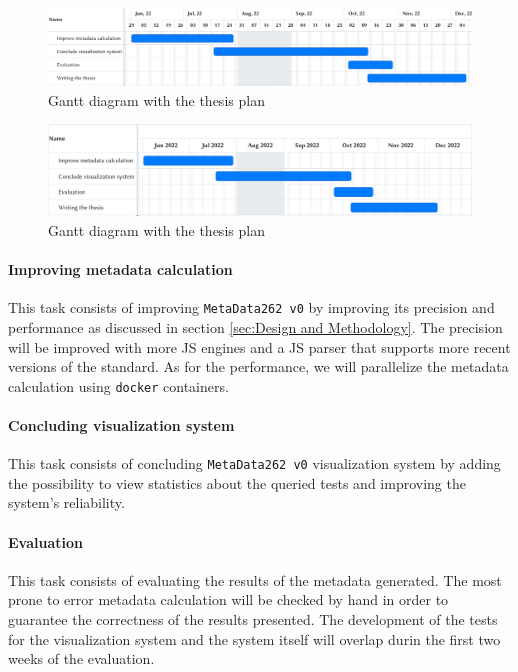 \documentclass[runningheads]{llncs}
\begin{document}
\begin{figure}[ht]
    \centering
    \includegraphics[width=1\textwidth]{images/gantt_thesis.png}
    \caption{Gantt diagram with the thesis plan}
    \label{fig:gantt}
\end{figure}

\begin{figure}[ht]
    \centering
    \includegraphics[width=1\textwidth]{images/gantt_thesis_month.png}
    \caption{Gantt diagram with the thesis plan}
    \label{fig:gantt_month}
\end{figure}



\paragraph{Improving metadata calculation}
This task consists of improving \texttt{MetaData262 v0} by improving its precision and performance as discussed in section \ref{sec:Design and Methodology}. The precision will be improved with more JS engines and a JS parser that supports more recent versions of the standard. As for the performance, we will parallelize the metadata calculation using \texttt{docker} containers.


\paragraph{Concluding visualization system}
This task consists of concluding \texttt{MetaData262 v0} visualization system by adding the possibility to view statistics about the queried tests and improving the system's reliability.


\paragraph{Evaluation}
This task consists of evaluating the results of the metadata generated. The most prone to error metadata calculation will be checked by hand in order to guarantee the correctness of the results presented. The development of the tests for the visualization system and the system itself will overlap durin the first two weeks of the evaluation. 
\end{document}
